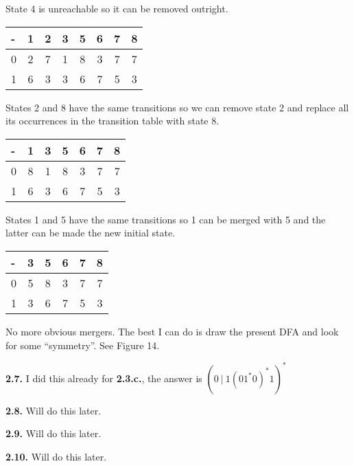 \documentclass{article}
\begin{document}
State 4 is unreachable so it can be removed outright.

\begin{center}
  \begin{tabular}{a | c | c | c | c | c | c | c}
    - & 1 & 2 & 3 & 5 & 6 & 7 & 8 \\
     & 2 & 7 & 1 & 8 & 3 & 7 & 7 \\
     & 6 & 3 & 3 & 6 & 7 & 5 & 3
  \end{tabular}
\end{center}

States 2 and 8 have the same transitions so we can remove state 2 and replace
all its occurrences in the transition table with state 8.

\begin{center}
  \begin{tabular}{a | c | c | c | c | c | c}
    - & 1 & 3 & 5 & 6 & 7 & 8 \\
     & 8 & 1 & 8 & 3 & 7 & 7 \\
     & 6 & 3 & 6 & 7 & 5 & 3
  \end{tabular}
\end{center}

States 1 and 5 have the same transitions so 1 can be merged with 5 and the
latter can be made the new initial state.

\begin{center}
  \begin{tabular}{a | c | c | c | c | c}
    - & 3 & 5 & 6 & 7 & 8 \\
     & 5 & 8 & 3 & 7 & 7 \\
     & 3 & 6 & 7 & 5 & 3
  \end{tabular}
\end{center}

No more obvious mergers. The best I can do is draw the present DFA and look for
some ``symmetry''. See Figure 14. 

\textbf{2.7.} I did this already for \textbf{2.3.c.}, the answer is 
\begin{math}
  {\left( 0\ \vert\ 1 {\left( 0 1^* 0 \right)}^* 1 \right)}^*
\end{math}

\textbf{2.8.} Will do this later.

\textbf{2.9.} Will do this later.

\textbf{2.10.} Will do this later.
\end{document}
